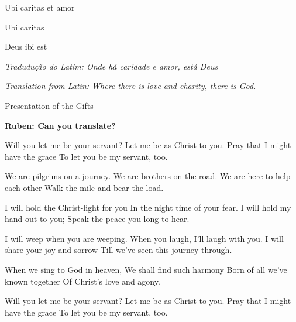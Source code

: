 Ubi caritas et amor

Ubi caritas

Deus ibi est

\vspace{5pt}

{\it Tradudução do Latim: Onde há caridade e amor, está Deus}

{\it Translation from Latin: Where there is love and charity, there is God.}

\vspace{20pt}

{\large Presentation of the Gifts}

{\bf Ruben: Can you translate?}

Will you let me be your servant?
Let me be as Christ to you.
Pray that I might have the grace
To let you be my servant, too.

We are pilgrims on a journey.
We are brothers on the road.
We are here to help each other
Walk the mile and bear the load.

I will hold the Christ-light for you
In the night time of your fear.
I will hold my hand out to you;
Speak the peace you long to hear.

I will weep when you are weeping.
When you laugh, I'll laugh with you.
I will share your joy and sorrow
Till we've seen this journey through.

When we sing to God in heaven,
We shall find such harmony
Born of all we've known together
Of Christ's love and agony.

Will you let me be your servant?
Let me be as Christ to you.
Pray that I might have the grace
To let you be my servant, too.


